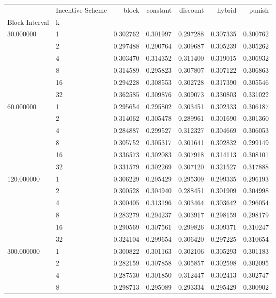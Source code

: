 \begin{tabular}{llrrrrr}
 & Incentive Scheme & block & constant & discount & hybrid & punish \\
Block Interval & k &  &  &  &  &  \\
\multirow[c]{6}{*}{30.000000} & 1 & 0.302762 & 0.301997 & 0.297288 & 0.307335 & 0.300762 \\
 & 2 & 0.297488 & 0.290764 & 0.309687 & 0.305239 & 0.305262 \\
 & 4 & 0.303470 & 0.314352 & 0.311400 & 0.319015 & 0.306932 \\
 & 8 & 0.314589 & 0.295823 & 0.307807 & 0.307122 & 0.306863 \\
 & 16 & 0.294228 & 0.308553 & 0.302728 & 0.317390 & 0.305546 \\
 & 32 & 0.362585 & 0.309876 & 0.309073 & 0.330803 & 0.331022 \\
\multirow[c]{6}{*}{60.000000} & 1 & 0.295654 & 0.295802 & 0.303451 & 0.302333 & 0.306187 \\
 & 2 & 0.314062 & 0.305478 & 0.289961 & 0.301690 & 0.301360 \\
 & 4 & 0.284887 & 0.299527 & 0.312327 & 0.304669 & 0.306053 \\
 & 8 & 0.305752 & 0.305317 & 0.301641 & 0.302832 & 0.299149 \\
 & 16 & 0.336573 & 0.302083 & 0.307918 & 0.314113 & 0.308101 \\
 & 32 & 0.331579 & 0.302269 & 0.307120 & 0.321527 & 0.317888 \\
\multirow[c]{6}{*}{120.000000} & 1 & 0.306229 & 0.295429 & 0.295309 & 0.299335 & 0.296193 \\
 & 2 & 0.300528 & 0.304940 & 0.288451 & 0.301909 & 0.304998 \\
 & 4 & 0.300405 & 0.313196 & 0.303464 & 0.303642 & 0.296054 \\
 & 8 & 0.283279 & 0.294237 & 0.303917 & 0.298159 & 0.298179 \\
 & 16 & 0.290569 & 0.307561 & 0.299826 & 0.309371 & 0.310247 \\
 & 32 & 0.324104 & 0.299654 & 0.306420 & 0.297225 & 0.310654 \\
\multirow[c]{6}{*}{300.000000} & 1 & 0.300822 & 0.301163 & 0.302106 & 0.305293 & 0.301183 \\
 & 2 & 0.282159 & 0.307858 & 0.305857 & 0.302598 & 0.302095 \\
 & 4 & 0.287530 & 0.301850 & 0.312447 & 0.302413 & 0.302747 \\
 & 8 & 0.298713 & 0.295089 & 0.293334 & 0.295429 & 0.300902 \\

\end{tabular}
